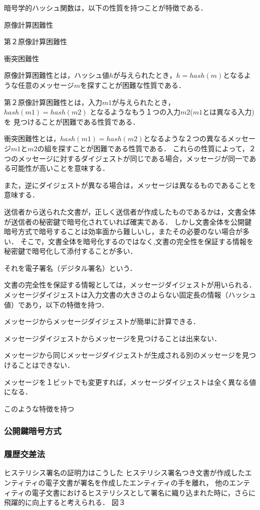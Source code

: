 \documentclass[a4paper,12pt]{jsarticle}
\begin{document}
暗号学的ハッシュ関数は，以下の性質を持つことが特徴である．

\item 原像計算困難性
\item 第２原像計算困難性
\item 衝突困難性

原像計算困難性とは，ハッシュ値$h$が与えられたとき，$ h = hash(m)$となるような任意のメッセージ$m$を探すことが困難な性質である．

第２原像計算困難性とは，入力$m1$が与えられたとき，$ hash(m1) = hash(m2)$ となるようなもう１つの入力$m2$($m1$とは異なる入力)を
見つけることが困難である性質である．

衝突困難性とは，$hash(m1)= hash(m2)$となるような２つの異なるメッセージ$m1$と$m2$の組を探すことが困難である性質である．
これらの性質によって，２つのメッセージに対するダイジェストが同じである場合，メッセージが同一である可能性が高いことを意味する．

また，逆にダイジェストが異なる場合は，メッセージは異なるものであることを意味する．


送信者から送られた文書が，正しく送信者が作成したものであるかは，文書全体が送信者の秘密鍵で暗号化されていれば確実である．
しかし文書全体を公開鍵暗号方式で暗号することは効率面から難しいし，またその必要のない場合が多い．
そこで，文書全体を暗号化するのではなく,文書の完全性を保証する情報を秘密鍵で暗号化して添付することが多い．

それを電子署名（デジタル署名）という．

文書の完全性を保証する情報としては，メッセージダイジェストが用いられる．
メッセージダイジェストは入力文書の大きさのよらない固定長の情報（ハッシュ値）であり，以下の特徴を持つ．

\item メッセージからメッセージダイジェストが簡単に計算できる．
\item メッセージダイジェストからメッセージを見つけることは出来ない．
\item メッセージから同じメッセージダイジェストが生成される別のメッセージを見つけることはできない．
\item メッセージを１ビットでも変更すれば，メッセージダイジェストは全く異なる値になる．

このような特徴を持つ

\subsubsection{公開鍵暗号方式}

\subsubsection{履歴交差法}
ヒステリシス署名の証明力はこうした
ヒステリシス署名つき文書が作成したエンティティの電子文書が署名を作成したエンティティの手を離れ，
他のエンティティの電子文書におけるヒステリシスとして署名に織り込まれた時に，さらに飛躍的に向上すると考えられる．
図３
\end{document}
